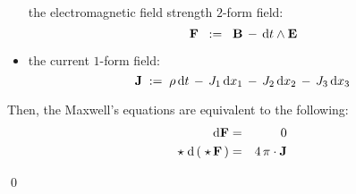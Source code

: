 \begin{theorem}
\begin{itemize}
	the electromagnetic field strength $2$-form field:
	\begin{equation*}
	\mathbf{F}
	\;\; := \;\;
		\mathbf{B} \, - \, \textnormal{d} t \wedge \mathbf{E}
	\end{equation*}
\item
	the current $1$-form field:
	\begin{equation*}
	\mathbf{J} \; := \; \rho \, \textnormal{d} t \,-\, J_{1}\,\textnormal{d} x_{1} \,-\, J_{2}\,\textnormal{d} x_{2} \,-\, J_{3}\,\textnormal{d} x_{3}
	\end{equation*}
\end{itemize}
Then, the Maxwell's equations are equivalent to the following:
\begin{eqnarray*}
\textnormal{d}\mathbf{F} & = & 0
\\
\star\;\textnormal{d} \left(\;\star\,\mathbf{F}\,\right) & = & 4\,\pi\cdot\mathbf{J}
\end{eqnarray*}
\end{theorem}
\proof

\qed







